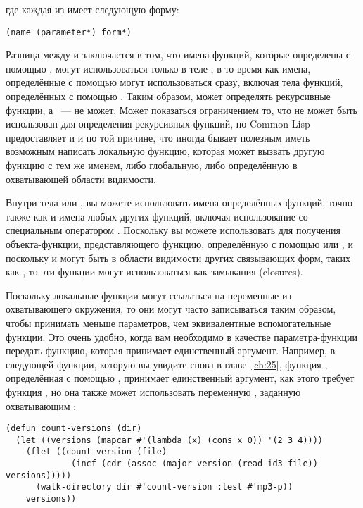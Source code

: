 \noindent{}где каждая из  имеет следующую форму:

\begin{lstlisting}
(name (parameter*) form*)
\end{lstlisting}

Разница между  и  заключается в том, что имена функций, которые
определены с помощью , могут использоваться только в теле , в то
время как имена, определённые с помощью  могут использоваться сразу, включая
тела функций, определённых с помощью . Таким образом,  может
определять рекурсивные функции, а ~--- не может.  Может показаться ограничением
то, что  не может быть использован для определения рекурсивных функций, но
Common Lisp предоставляет и  и  по той причине, что иногда бывает
полезным иметь возможным написать локальную функцию, которая может вызвать другую функцию
с тем же именем, либо глобальную, либо определённую в охватывающей области видимости.

Внутри тела  или , вы можете использовать имена определённых
функций, точно также как и имена любых других функций, включая использование со
специальным оператором .  Поскольку вы можете использовать 
для получения объекта-функции, представляющего функцию, определённую с помощью 
или , и поскольку  и  могут быть в области видимости
других связывающих форм, таких как , то эти функции могут использоваться как
замыкания (closures).

Поскольку локальные функции могут ссылаться на переменные из охватывающего окружения, то
они могут часто записываться таким образом, чтобы принимать меньше параметров, чем
эквивалентные вспомогательные функции.  Это очень удобно, когда вам необходимо в качестве
параметра-функции передать функцию, которая принимает единственный аргумент. Например, в
следующей функции, которую вы увидите снова в главе~\ref{ch:25}, функция
, определённая с помощью , принимает единственный аргумент,
как этого требует функция , но она также может использовать
переменную , заданную охватывающим :

\begin{lstlisting}
(defun count-versions (dir)
  (let ((versions (mapcar #'(lambda (x) (cons x 0)) '(2 3 4))))
    (flet ((count-version (file)
             (incf (cdr (assoc (major-version (read-id3 file)) versions)))))
      (walk-directory dir #'count-version :test #'mp3-p))
    versions))
\end{lstlisting}

